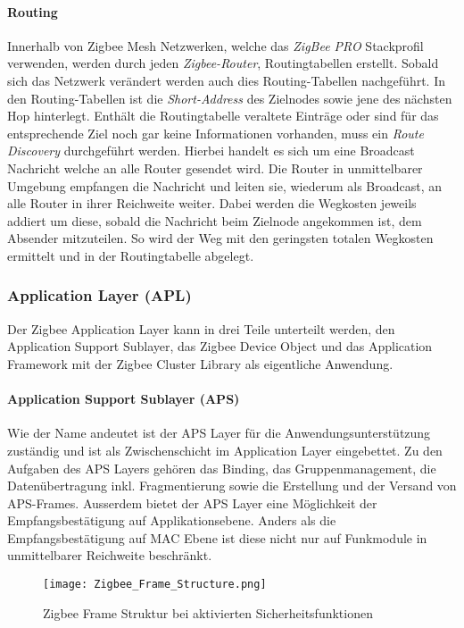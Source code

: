 \paragraph{Routing}
Innerhalb von Zigbee Mesh Netzwerken, welche das \textit{ZigBee PRO} Stackprofil verwenden, werden durch jeden \textit{Zigbee-Router}, Routingtabellen erstellt.
Sobald sich das Netzwerk verändert werden auch dies Routing-Tabellen nachgeführt.
In den Routing-Tabellen ist die \textit{Short-Address} des Zielnodes sowie jene des nächsten Hop hinterlegt.
Enthält die Routingtabelle veraltete Einträge oder sind für das entsprechende Ziel noch gar keine Informationen vorhanden, muss ein \textit{Route Discovery} durchgeführt werden.
Hierbei handelt es sich um eine Broadcast Nachricht welche an alle Router gesendet wird.
Die Router in unmittelbarer Umgebung empfangen die Nachricht und leiten sie, wiederum als Broadcast, an alle Router in ihrer Reichweite weiter.
Dabei werden die Wegkosten jeweils addiert um diese, sobald die Nachricht beim Zielnode angekommen ist, dem Absender mitzuteilen.
So wird der Weg mit den geringsten totalen Wegkosten ermittelt und in der Routingtabelle abgelegt.


\subsubsection{Application Layer (APL)}\label{subsubsec:ApplicationLayer}
Der Zigbee Application Layer kann in drei Teile unterteilt werden, den Application Support Sublayer, das Zigbee Device Object und das Application Framework mit der Zigbee Cluster Library als eigentliche Anwendung.

\paragraph{Application Support Sublayer (APS)}
Wie der Name andeutet ist der APS Layer für die Anwendungsunterstützung zuständig und ist als Zwischenschicht im Application Layer eingebettet.
Zu den Aufgaben des APS Layers gehören das Binding, das Gruppenmanagement, die Datenübertragung inkl. Fragmentierung sowie die Erstellung und der Versand von APS-Frames.
Ausserdem bietet der APS Layer eine Möglichkeit der Empfangsbestätigung auf Applikationsebene.
Anders als die Empfangsbestätigung auf MAC Ebene ist diese nicht nur auf Funkmodule in unmittelbarer Reichweite beschränkt.

\begin{figure}[h]
	\centering
	\texttt{[image: Zigbee\_Frame\_Structure.png]}
	\caption{Zigbee Frame Struktur bei aktivierten Sicherheitsfunktionen \cite[S.~286]{markus_krause_rainer_konrad_zigbee_2014}}
	\label{fig:ZigbeeFrameStruktur}
\end{figure}

